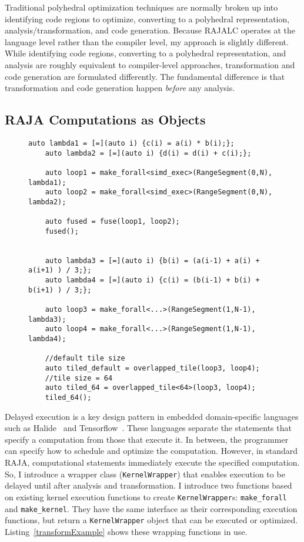 Traditional polyhedral optimization techniques are normally broken up into identifying code regions to optimize, converting to a polyhedral representation, analysis/transformation, and code generation. 
Because RAJALC operates at the language level rather than the compiler level, my approach is slightly different. While identifying code regions, converting to a polyhedral representation, and analysis are roughly equivalent to compiler-level approaches, transformation and code generation are formulated differently. 
The fundamental difference is that transformation and code generation happen \textit{before} any analysis.

\subsection{RAJA Computations as Objects}
\begin{figure}[t]
	\begin{lstlisting}[caption={Using the \texttt{fuse} and \texttt{overlapped\_tile} transformations.}, label={transformExample}]
	auto lambda1 = [=](auto i) {c(i) = a(i) * b(i);};
	auto lambda2 = [=](auto i) {d(i) = d(i) + c(i);};
	
	auto loop1 = make_forall<simd_exec>(RangeSegment(0,N), lambda1);
	auto loop2 = make_forall<simd_exec>(RangeSegment(0,N), lambda2);
	
	auto fused = fuse(loop1, loop2);
	fused();
	
	
	auto lambda3 = [=](auto i) {b(i) = (a(i-1) + a(i) + a(i+1) ) / 3;};
	auto lambda4 = [=](auto i) {c(i) = (b(i-1) + b(i) + b(i+1) ) / 3;};
	
	auto loop3 = make_forall<...>(RangeSegment(1,N-1), lambda3);
	auto loop4 = make_forall<...>(RangeSegment(1,N-1), lambda4);
	
	//default tile size
	auto tiled_default = overlapped_tile(loop3, loop4);
	//tile size = 64
	auto tiled_64 = overlapped_tile<64>(loop3, loop4);
	tiled_64();
	 \end{lstlisting}
	\end{figure}
Delayed execution is a key design pattern in %
embedded domain-specific languages such as
Halide~\cite{Ragan-Kelley2013} and Tensorflow~\cite{tensorflow}.
These languages separate the statements that specify a computation from
those that execute it.
In between, the programmer can specify how to schedule and optimize the computation.
However, in standard RAJA, computational  statements immediately execute the specified computation.
So, I introduce a wrapper class (\verb.KernelWrapper.) that enables execution
to be delayed until after analysis and transformation.
I introduce two functions based on existing kernel execution functions to
create \verb.KernelWrapper.s: \verb.make_forall. and \verb.make_kernel..
They have the same interface as their corresponding execution functions, but
return a \verb.KernelWrapper. object that can be executed or optimized.
Listing~\ref{transformExample} shows these wrapping functions in use. 


